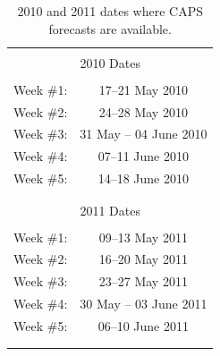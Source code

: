 \begin{table}[cc]
    \centering
    \setlength{\tabcolsep}{0.5in}
    \renewcommand{\arraystretch}{1.25}
    \caption[2010 and 2011 dates where CAPS forecasts are available.]
    {2010 and 2011 dates where CAPS forecasts are available.}
    \label{sfedtes} \vspace{0.25in}
    \begin{tabular}{||c c||}
        \hline \hline
        \vspace{\baselineskip} & \vspace{\baselineskip} \\
        \multicolumn{2}{||c||}{\Large 2010 Dates} \\
        \vspace{\baselineskip} & \vspace{\baselineskip} \\
        Week \#1: & 17--21 May 2010 \\
        Week \#2: & 24--28 May 2010 \\
        Week \#3: & 31 May -- 04 June 2010 \\
        Week \#4: & 07--11 June 2010 \\
        Week \#5: & 14--18 June 2010 \\
        \vspace{\baselineskip} & \vspace{\baselineskip} \\
        \hline
        \vspace{\baselineskip} & \vspace{\baselineskip} \\
        \multicolumn{2}{||c||}{\Large 2011 Dates} \\
        \vspace{\baselineskip} & \vspace{\baselineskip} \\
        Week \#1: & 09--13 May 2011 \\
        Week \#2: & 16--20 May 2011 \\
        Week \#3: & 23--27 May 2011 \\
        Week \#4: & 30 May -- 03 June 2011 \\
        Week \#5: & 06--10 June 2011 \\
        \vspace{\baselineskip} & \vspace{\baselineskip} \\
        \hline
        \vspace{\baselineskip} & \vspace{\baselineskip} \\

\end{tabular}
\end{table}
